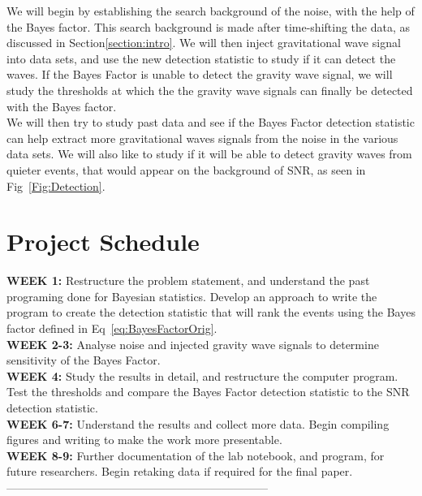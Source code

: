 \documentclass{article}
\begin{document}
 We will begin by establishing the search background of the noise, with the help of the Bayes factor. This search background is made after time-shifting the data, as discussed in Section\ref{section:intro}.  We will then inject gravitational wave signal into data sets, and use the new detection statistic to study if it can detect the waves. If the Bayes Factor is unable to detect the gravity wave signal, we will study the thresholds at which the the gravity wave signals can finally be detected with the Bayes factor. \\
 
 We will then try to study past data and see if the Bayes Factor detection statistic can help extract more gravitational waves signals from the noise in the various data sets. We will also like to study if it will be able to detect gravity waves from quieter events, that would appear on the background of SNR, as seen in Fig~\ref{Fig:Detection}.
 
 
 
 
 
 \section{Project Schedule}
 
 
 \textbf{WEEK 1:} Restructure the problem statement, and understand the past programing done for Bayesian statistics. Develop an approach to write the program to create the detection statistic that will rank the events using the Bayes factor defined in Eq~\ref{eq:BayesFactorOrig}.\\
 \textbf{WEEK 2-3:} Analyse noise and injected gravity wave signals to determine sensitivity of the Bayes Factor.\\
 \textbf{WEEK 4:} Study the results in detail, and restructure the computer program. Test the thresholds and compare the Bayes Factor detection statistic to the SNR detection statistic. \\
  \textbf{WEEK 6-7:} Understand the results and collect more data. Begin compiling figures and writing to make the work more presentable. \\
  \textbf{WEEK 8-9:} Further documentation of the lab notebook, and program, for future researchers. Begin retaking data if required for the final paper.\\
 
 
 
 
 
---------------------------------------------------------------------
 
 
 
 
\end{document}

